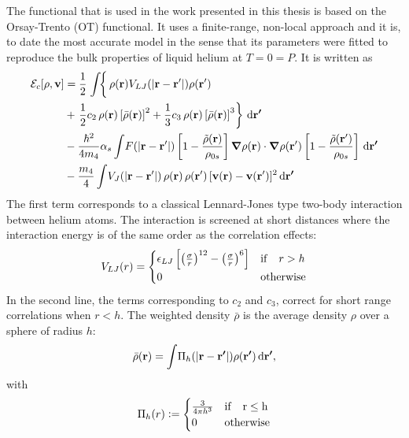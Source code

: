 		The functional that is used in the work presented in this thesis is based on the Orsay-Trento (OT) functional\citep{Dalfovo1995}. It uses a finite-range, non-local approach and it is, to date the most accurate model in the sense that its parameters were fitted to reproduce the bulk properties of liquid helium at $T=0=P$. It is written as
		\begin{align}
			\mathcal{E}_c[\rho ,\bm{\mathrm{v}}] &=  
			\frac{1}{2} \left.\int \! \right\{\rho({\bf r}) V_{LJ}(|{\bf r}-{\bf r'}|) \rho({\bf r'}) \nonumber \\
			&+ \left.\frac{1}{2} c_2\, \rho({\bf r}) \left[{\bar \rho}({\bf r}) \right]^2 
			+ \frac{1}{3} c_3 \, \rho({\bf r}) \left[ {\bar \rho}({\bf r}) \right]^3\right\}\,\mathrm{d}{\bm{\mathrm{r'}}} \nonumber \\
			&- \frac{\hbar^2}{4m_4} \alpha_s \int \! F(|{\bf r}-{\bf r'}|) \left[ 1- \frac{{\tilde \rho}({\bf r})}{\rho_{0s}} \right]\grad{\rho({\bf r})} \cdot \grad{\rho({\bf r'})} \left[ 1- \frac{{\tilde \rho}({\bf r'})}{\rho_{0s}} \right]\,\mathrm{d}{\bm{\mathrm{r'}}} \nonumber \\
			& - \frac{m_4}{4} \int \! V_J(| \mathbf{r} - \mathbf{r}'|)\, \rho(\mathbf{r}) \, \rho(\mathbf{r}')\,  [\mathbf{v}(\mathbf{r})-\mathbf{v}(\mathbf{r}')]^2\,\mathrm{d}{\bm{\mathrm{r'}}} \label{eq:otf}
		\end{align}
		The first term corresponds to a classical Lennard-Jones type two-body interaction between helium atoms. The interaction is screened at short distances where the interaction energy is of the same order as the correlation effects:
		\begin{align}
			V_{LJ}(r) = \begin{cases}
			\epsilon_{LJ} \left[\left(\frac{\sigma}{r} \right)^{12} - \left(\frac{\sigma}{r} \right)^{6} \right] & {\rm if} \quad r > h \\
			0 & {\rm otherwise}
			\end{cases}\label{eq9}
		\end{align}
		In the second line, the terms corresponding to $c_2$ and $c_3$, correct for short range correlations when $r<h$. The weighted density $\bar{\rho}$ is the average density $\rho$ over a sphere of radius $h$:
		\begin{align}
			\bar{\rho}(\bm{\mathrm{r}}) = \int\!\Pi_h\qty(\abs{\bm{\mathrm{r}}-\bm{\mathrm{r'}}})\rho({\bm{\mathrm{r'}}})\,\mathrm{d}{\bm{\mathrm{r'}}},
		\end{align}
		with
		\begin{align}
			\Pi_h(r) \vcentcolon= \begin{cases}
				\frac{3}{4\pi h^3} & \rm{if} \quad r\leq h \\
				0 & \rm{otherwise}
			\end{cases}
		\end{align}
